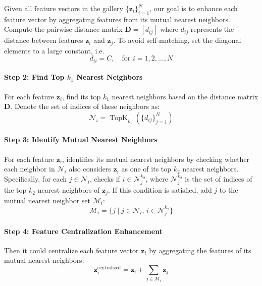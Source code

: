 Given all feature vectors in the gallery \(\{\mathbf{z}_i\}_{i=1}^N\), our goal is to enhance each feature vector by aggregating features from its mutual nearest neighbors.
Compute the pairwise distance matrix \(\mathbf{D} = [d_{ij}]\) where \(d_{ij}\) represents the distance between features \(\mathbf{z}_i\) and \(\mathbf{z}_j\). To avoid self-matching, set the diagonal elements to a large constant, i.e. \[d_{ii} = C, \quad \text{for } i = 1, 2, \dots, N\]

\paragraph{Step 2: Find Top \(k_1\) Nearest Neighbors}

For each feature \(\mathbf{z}_i\), find its top \(k_1\) nearest neighbors based on the distance matrix \(\mathbf{D}\). Denote the set of indices of these neighbors as:
\begin{equation}
\mathcal{N}_{i} = \operatorname{TopK}_{k_1}(\{d_{ij}\}_{j=1}^N)
\end{equation}

\paragraph{Step 3: Identify Mutual Nearest Neighbors}

For each feature \(\mathbf{z}_i\), identifies its mutual nearest neighbors by checking whether each neighbor in \(\mathcal{N}_{i}\) also considers \(\mathbf{z}_i\) as one of its top \(k_2\) nearest neighbors. Specifically, for each \(j \in \mathcal{N}_{i}\), checks if \(i \in \mathcal{N}_{j}^{k_2}\), where \(\mathcal{N}_{j}^{k_2}\) is the set of indices of the top \(k_2\) nearest neighbors of \(\mathbf{z}_j\). If this condition is satisfied, add \(j\) to the mutual nearest neighbor set \(\mathcal{M}_{i}\):
\begin{equation}
\mathcal{M}_{i} = \{ j \mid j \in \mathcal{N}_{i}, \, i \in \mathcal{N}_{j}^{k_2} \}
\end{equation}

\paragraph{Step 4: Feature Centralization Enhancement}

Then it could centralize each feature vector \(\mathbf{z}_i\) by aggregating the features of its mutual nearest neighbors:
\begin{equation}
\mathbf{z}_i^{\text{centralized}} = \mathbf{z}_i + \sum_{j \in \mathcal{M}_{i}} \mathbf{z}_j
\end{equation}


